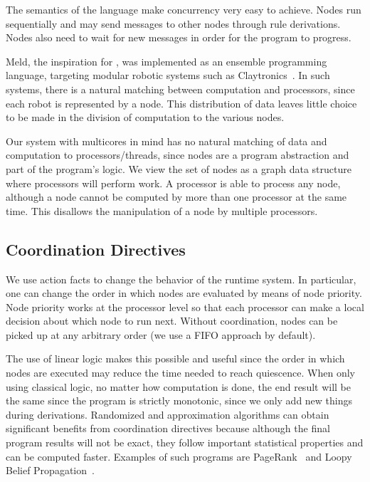 The semantics of the \lang language make concurrency very easy to achieve.
Nodes run sequentially and may send messages to other nodes through rule derivations. Nodes
also need to wait for new messages in order for the program to progress.

Meld, the inspiration for \lang, was
implemented as an ensemble programming language, targeting modular robotic systems such as
Claytronics~\cite{ashley-rollman-derosa-iros07wksp}. In such systems, there is a natural matching
between computation and processors, since each robot is represented by a node. This distribution
of data leaves little choice to be made in the division of computation to the various nodes.

Our \lang system with multicores in mind has no natural matching of data and computation to processors/threads,
since nodes are a program abstraction and part of the program's logic.
We view the set of nodes as a graph data structure where processors will perform work.
A processor is able to process any node, although a node cannot be computed by more than one processor
at the same time. This disallows the manipulation of a node by multiple processors.

\subsection{Coordination Directives}

We use action facts to change the behavior of the runtime system. In particular, one can change the
order in which nodes are evaluated by means of node priority. Node priority works at the processor level
so that each processor can make a local decision about which node to run next. Without coordination,
nodes can be picked up at any arbitrary order (we use a FIFO approach by default).

The use of linear logic makes this possible and useful since the order in which nodes are executed
may reduce the time needed to reach quiescence. When only using
classical logic, no matter how computation is done, the end result will be the same since the program
is strictly monotonic, since we only add new things during derivations. Randomized and approximation
algorithms can obtain significant benefits from coordination directives because although the final program results
will not be exact, they follow important statistical properties and can be computed faster.
Examples of such programs are PageRank~\cite{Lubachevsky:1986:CAA:4904.4801} and
Loopy Belief Propagation~\cite{Gonzalez+al:aistats09paraml}.

